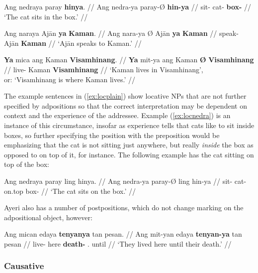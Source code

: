 \pex\label{ex:locplain}
\a\label{ex:locnedra}\begingl
	\gla Ang nedraya paray \textbf{hinya}. //
	\glb Ang nedra-ya paray-Ø \textbf{hin-ya} //
	\glc \AgtT{} sit-\TsgM{} cat-\Top{} \textbf{box-\Loc{}} //
	\glft `The cat sits in the box.' //
\endgl

\a\label{ex:locnara}\begingl
	\gla Ang naraya {} Ajān \textbf{ya} \textbf{Kaman}. //
	\glb Ang nara-ya Ø Ajān \textbf{ya} \textbf{Kaman} //
	\glc \AgtT{} speak-\TsgM{} \Top{} Ajān \textbf{\Loc{}} \textbf{Kaman} //
	\glft `Ajān speaks to Kaman.' //
\endgl

\a\label{ex:locmit}\begingl
	\gla \textbf{Ya} mica ang Kaman \textbf{{}} \textbf{Visamhinang}. //
	\glb \textbf{Ya} mit-ya ang Kaman \textbf{Ø} \textbf{Visamhinang} //
	\glc \textbf{\LocT{}} live-\TsgM{} \Aarg{} Kaman \textbf{\Top{}} 
		\textbf{Visamhinang} //
	\glft `Kaman lives in Visamhinang',\\
		or: `Visamhinang is where Kaman lives.' //
\endgl

\xe

The example sentences in (\ref{ex:locplain}) show locative NPs that are not 
further specified by adpositions so that the correct interpretation may be 
dependent on context and the experience of the addressee. Example 
(\ref{ex:locnedra}) is an instance of this circumstance, insofar as experience 
tells that cats like to sit inside boxes, so further specifying the position 
with the preposition  would be emphasizing that the cat 
is not sitting just anywhere, but really \emph{inside} the box as opposed to on 
top of it, for instance. The following example has the cat sitting on top of the 
box:

\ex\begingl
	\gla Ang nedraya paray ling hinya. //
	\glb Ang nedra-ya paray-Ø ling hin-ya //
	\glc \AgtT{} sit-\TsgM{} cat-\Top{} on.top box-\Loc{} //
	\glft `The cat sits on the box.' //
\endgl\xe

Ayeri also has a number of postpositions, which do not change marking on the 
adpositional object, however:

\ex\begingl
	\gla Ang mican edaya \textbf{tenyanya} tan pesan. //
	\glb Ang mit-yan edaya \textbf{tenyan-ya} tan pesan //
	\glc \AgtT{} live-\TplM{} here \textbf{death-\Loc{}} \TplM{}.\Gen{} 
		until //
	\glft `They lived here until their death.' //
\endgl\xe


\subsubsection{Causative}

